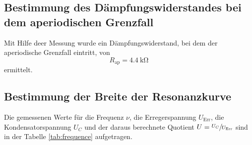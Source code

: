 \subsection{Bestimmung des Dämpfungswiderstandes bei dem aperiodischen Grenzfall}
Mit Hilfe deer Messung wurde ein Dämpfungswiderstand, bei dem der aperiodische Grenzfall eintritt, von
\begin{equation*}
    R_\text{ap} = \SI{4.4}{\kilo\ohm}
\end{equation*}
ermittelt.
\subsection{Bestimmung der Breite der Resonanzkurve}
Die gemessenen Werte für die Frequenz $\nu$, die Erregerspannung
$U_\text{Err}$, die Kondensatorspannung $U_C$ und der daraus berechnete Quotient $U = \sfrac{U_C}{U_\text{Err}}$
sind in der Tabelle \ref{tab:frequence} aufgetragen.
